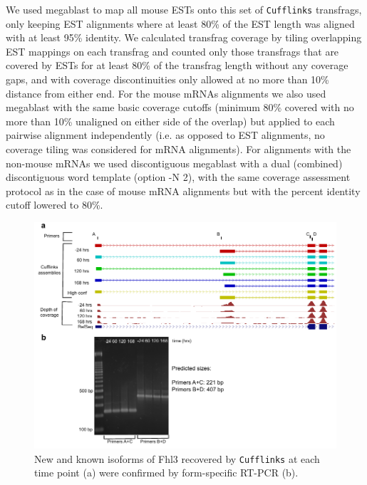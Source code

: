 \documentclass[12pt]{amsart}
\theoremstyle{definition}
\begin{document}
We used megablast to map all mouse ESTs onto this set of {\tt Cufflinks}
transfrags, only keeping EST alignments where at least 80\% of the EST length
was aligned with at least 95\% identity. We calculated transfrag coverage by
tiling overlapping EST mappings on each transfrag and counted only those
transfrags that are covered by ESTs for at least 80\% of the transfrag length
without any coverage gaps, and with coverage discontinuities only allowed at
no more than 10\% distance from either end. For the mouse mRNAs alignments we
also used megablast with the same basic coverage cutoffs (minimum 80\% covered
with no more than 10\% unaligned on either side of the overlap) but applied to
each pairwise alignment independently (i.e. as opposed to EST alignments, no
coverage tiling was considered for mRNA alignments). For alignments with the
non-mouse mRNAs we used discontiguous megablast with a dual (combined)
discontiguous word template (option -N 2), with the same coverage assessment
protocol as in the case of mouse mRNA alignments but with the percent identity
cutoff lowered to 80\%.

\begin{figure}[h] 
    \includegraphics{pdfs/FHL3_RT-PCR.pdf}
    \caption[New isoform of Fhl3]{New and known isoforms of Fhl3 recovered by {\tt Cufflinks} at each time point (a) were confirmed by form-specific RT-PCR (b). \label{FHL3_RT-PCR}}
\end{figure}
\end{document}
